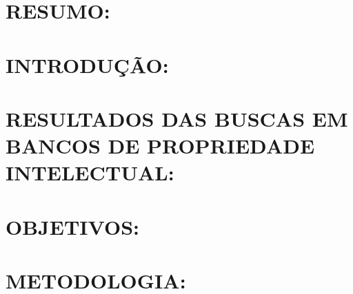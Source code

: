 \documentclass{article}
\begin{document}


\section{RESUMO:} \label{sec:resumo}

\section{INTRODUÇÃO:} \label{sec:introdução}

\section{RESULTADOS DAS BUSCAS EM BANCOS DE PROPRIEDADE INTELECTUAL:} \label{sec:resultados_patentes}

\section{OBJETIVOS:} \label{sec:objetivos}

\section{METODOLOGIA:} \label{sec:metodologia}
\end{document}
